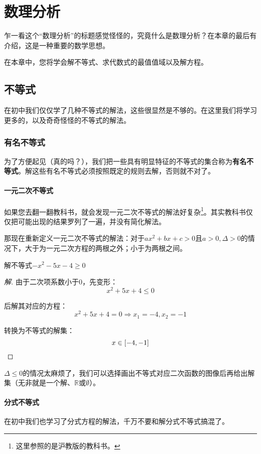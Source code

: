 \chapter{数理分析}
乍一看这个“数理分析”的标题感觉怪怪的，究竟什么是数理分析？在本章的最后有介绍，这是一种重要的数学思想。

在本章中，您将学会解不等式、求代数式的最值值域以及解方程。

\section{不等式}
在初中我们仅仅学了几种不等式的解法，这些很显然是不够的。在这里我们将学习更多的，以及奇奇怪怪的不等式的解法。

\subsection[有名]{有名不等式}
为了方便起见（真的吗？），我们把一些具有明显特征的不等式的集合称为\textbf{有名不等式}。解这些有名不等式必须按照既定的规则去解，否则就不对了。

\subsubsection{一元二次不等式}
如果您去翻一翻教科书，就会发现一元二次不等式的解法好复杂\footnote{这里参照的是沪教版的教科书。}。其实教科书仅仅把可能出现的结果罗列了一遍，并没有简化解法。

那现在重新定义一元二次不等式的解法：对于$ax^2+bx+c>0$且$a>0,\Delta>0$的情况下，大于为一元二次方程的两根之外；小于为两根之间。

\begin{example}
	解不等式$-x^2-5x-4\geq0$
\end{example}
\begin{proof}[解]
	由于二次项系数小于$0$，先变形：\[x^2+5x+4\leq0\]

	后解其对应的方程：\[x^2+5x+4=0\Rightarrow x_1=-4,x_2=-1\]

	转换为不等式的解集：\[x\in[-4,-1]\qedhere\]
\end{proof}

$\Delta\leq0$的情况太麻烦了，我们可以选择画出不等式对应二次函数的图像后再给出解集（无非就是一个解、$\mathbb{R}$或$\emptyset$）。

\subsubsection{分式不等式}
在初中我们也学习了分式方程的解法，千万不要和解分式不等式搞混了。

